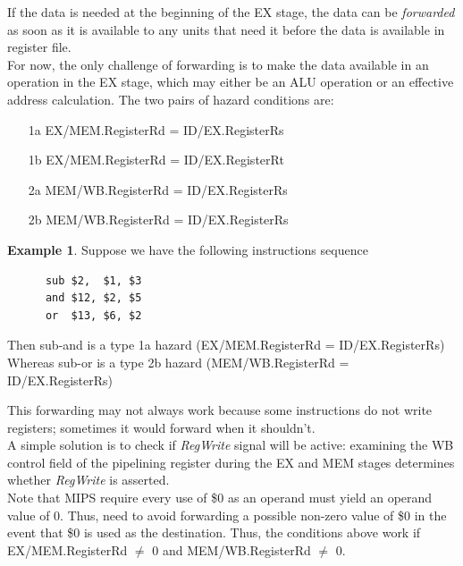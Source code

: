 \documentclass[12pt]{article}
\theoremstyle{definition}
\newtheorem{ex}{Example}[section]
\begin{document}
  If the data is needed at the beginning of the EX stage, the data can be \emph{forwarded} as soon as it is available to any units that need it before the data is available in register file. \\
  For now, the only challenge of forwarding is to make the data available in an operation in the EX stage, which may either be an ALU operation or an effective address calculation.
  The two pairs of hazard conditions are:
  \begin{enumerate}
    \item[1a] EX/MEM.RegisterRd = ID/EX.RegisterRs
    \item[1b] EX/MEM.RegisterRd = ID/EX.RegisterRt
    \item[2a] MEM/WB.RegisterRd = ID/EX.RegisterRs
    \item[2b] MEM/WB.RegisterRd = ID/EX.RegisterRs
  \end{enumerate}

  \begin{ex}
    Suppose we have the following instructions sequence
    \begin{verbatim}
      sub $2,  $1, $3
      and $12, $2, $5
      or  $13, $6, $2
    \end{verbatim}
    Then sub-and is a type 1a hazard (EX/MEM.RegisterRd = ID/EX.RegisterRs)
    Whereas sub-or is a type 2b hazard (MEM/WB.RegisterRd = ID/EX.RegisterRs)
  \end{ex}
  This forwarding may not always work because some instructions do not write registers;
  sometimes it would forward when it shouldn't. \\
  A simple solution is to check if \emph{RegWrite} signal will be active: examining the WB control field of the pipelining register during the EX and MEM stages determines whether \emph{RegWrite} is asserted. \\
  Note that MIPS require every use of \$0 as an operand must yield an operand value of 0.
  Thus, need to avoid forwarding a possible non-zero value of \$0 in the event that \$0 is used as the destination.
  Thus, the conditions above work if EX/MEM.RegisterRd $\not =$ 0 and MEM/WB.RegisterRd $\not =$ 0.
\end{document}
